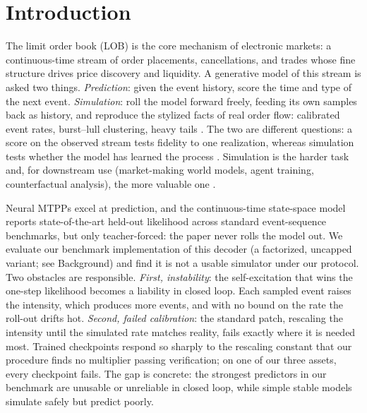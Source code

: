 \section{Introduction}
\label{sec:intro}

The limit order book (LOB) is the core mechanism of electronic markets: a
continuous-time stream of order placements, cancellations, and trades whose
fine structure drives price discovery and liquidity. A generative model of
this stream is asked two things. \emph{Prediction}: given the event history,
score the time and type of the next event. \emph{Simulation}: roll the model
forward freely, feeding its own samples back as history, and reproduce the
stylized facts of real order flow: calibrated event rates, burst--lull
clustering, heavy tails \citep{cont2001empirical}. The two are different questions: a score on the observed stream
tests fidelity to one realization, whereas simulation tests whether the
model has learned the process \citep{kumar2025f2sp}. Simulation is the
harder task and, for downstream use (market-making world models, agent
training, counterfactual analysis), the more valuable one
\citep{mars2025,nagy2025lobbench}.

Neural MTPPs \citep{du2016recurrent,Mei2017TheProcess,Shchur2021NeuralReview}
excel at prediction, and the continuous-time state-space model \sppp{}
\citep{chang2025ctssm} reports state-of-the-art held-out likelihood across
standard event-sequence benchmarks, but only teacher-forced: the \sppp{}
paper never rolls the model out. We evaluate our benchmark implementation
of this decoder (a factorized, uncapped variant; see Background) and find
it is not a usable simulator under our protocol. Two obstacles are
responsible. \emph{First, instability}: the self-excitation that wins the
one-step likelihood becomes a liability in closed loop. Each sampled
event raises the intensity, which produces more events, and with no bound on
the rate the roll-out drifts hot. \emph{Second, failed calibration}: the
standard patch, rescaling the intensity until the simulated rate matches
reality, fails exactly where it is needed most. Trained \spppu{} checkpoints
respond so sharply to the rescaling constant that our procedure finds no
multiplier passing verification; on one of our three assets, every \spppu{}
checkpoint fails. The gap is concrete: the strongest predictors in our
benchmark are unusable or unreliable in closed loop, while simple stable
models simulate safely but predict poorly.

